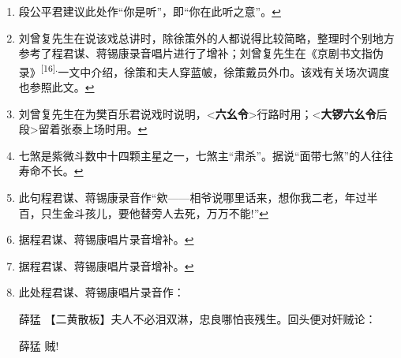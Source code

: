 \begin{enumerate}
  \begin{quote}
  (樊梨花 仙师有何吩咐?)

  薛丁山
  仙师赐你丹药二料，一要戴之胸膛，二要用清水服下。\ldots{}\ldots{}，料无妨碍。

  薛丁山 夫人请至后帐。

  (薛丁山、樊梨花下)
  \end{quote}

  \protect\hyperlink{fnref363}{↩}
\item
  \leavevmode\hypertarget{fn364}{}%
  段公平君建议此处作``你是听''，即``你在此听之意''。\protect\hyperlink{fnref364}{↩}
\item
  \leavevmode\hypertarget{fn365}{}%
  刘曾复先生在说该戏总讲时，除徐策外的人都说得比较简略，整理时个别地方参考了程君谋、蒋锡康录音唱片进行了增补；刘曾复先生在《京剧书文指伪录》\textsuperscript{{[}16{]}.}一文中介绍，徐策和夫人穿蓝帔，徐策戴员外巾。该戏有关场次调度也参照此文。\protect\hyperlink{fnref365}{↩}
\item
  \leavevmode\hypertarget{fn366}{}%
  刘曾复先生在为樊百乐君说戏时说明，\textless{}\textbf{六幺令}\textgreater{}行路时用；\textless{}\textbf{大锣六幺令}后段\textgreater{}留着张泰上场时用。\protect\hyperlink{fnref366}{↩}
\item
  \leavevmode\hypertarget{fn367}{}%
  七煞是紫微斗数中十四颗主星之一，七煞主``肃杀''。据说``面带七煞''的人往往寿命不长。\protect\hyperlink{fnref367}{↩}
\item
  \leavevmode\hypertarget{fn368}{}%
  此句程君谋、蒋锡康录音作``欸------相爷说哪里话来，想你我二老，年过半百，只生金斗孩儿，要他替旁人去死，万万不能!''\protect\hyperlink{fnref368}{↩}
\item
  \leavevmode\hypertarget{fn369}{}%
  据程君谋、蒋锡康唱片录音增补。\protect\hyperlink{fnref369}{↩}
\item
  \leavevmode\hypertarget{fn370}{}%
  据程君谋、蒋锡康唱片录音增补。\protect\hyperlink{fnref370}{↩}
\item
  \leavevmode\hypertarget{fn371}{}%
  此处程君谋、蒋锡康唱片录音作：

  薛猛 【二黄散板】夫人不必泪双淋，忠良哪怕丧残生。回头便对奸贼论：

  薛猛 贼!


\end{enumerate}
